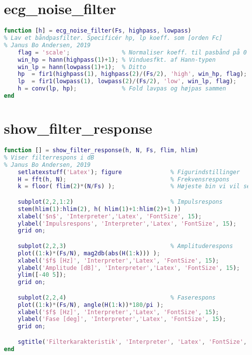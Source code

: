\documentclass[a4paper]{report}
\begin{document}
\section{ecg\_noise\_filter}

        
\begin{lstlisting}[language=Matlab, style=Matlab-editor]
function [h] = ecg_noise_filter(Fs, highpass, lowpass)
% Lav et båndpasfilter. Specificér hp, lp koeff. som [orden Fc]
% Janus Bo Andersen, 2019
    flag = 'scale';               % Normaliser koeff. til pasbånd på 0 dB
    win_hp = hann(highpass(1)+1); % Vinduesfkt. af Hann-typen
    win_lp = hann(lowpass(1)+1);  % Ditto
    hp  = fir1(highpass(1), highpass(2)/(Fs/2), 'high', win_hp, flag);
    lp  = fir1(lowpass(1), lowpass(2)/(Fs/2), 'low', win_lp, flag);
    h = conv(lp, hp);             % Fold lavpas og højpas sammen
end
\end{lstlisting}



\section{show\_filter\_response}

        
\begin{lstlisting}[language=Matlab, style=Matlab-editor]
function [] = show_filter_response(h, N, Fs, flim, hlim)
% Viser filterrespons i dB
% Janus Bo Andersen, 2019
    setlatexstuff('Latex'); figure              % Figurindstillinger
    H = fft(h, N);                              % Frekvensrespons
    k = floor( flim(2)*(N/Fs) );                % Højeste bin vi vil se

    subplot(2,2,1:2)                            % Impulsrespons
    stem(hlim(1):hlim(2), h( hlim(1)+1:hlim(2)+1 ))
    xlabel('$n$', 'Interpreter','Latex', 'FontSize', 15);
    ylabel('Impulsrespons', 'Interpreter','Latex', 'FontSize', 15);
    grid on;

    subplot(2,2,3)                              % Amplituderespons
    plot((1:k)*(Fs/N), mag2db(abs(H(1:k))) );
    xlabel('$f$ [Hz]', 'Interpreter','Latex', 'FontSize', 15);
    ylabel('Amplitude [dB]', 'Interpreter','Latex', 'FontSize', 15);
    ylim([-40 5]);
    grid on;

    subplot(2,2,4)                              % Faserespons
    plot((1:k)*(Fs/N), angle(H(1:k))*180/pi );
    xlabel('$f$ [Hz]', 'Interpreter','Latex', 'FontSize', 15);
    ylabel('Fase [deg]', 'Interpreter','Latex', 'FontSize', 15);
    grid on;

    sgtitle('Filterkarakteristik', 'Interpreter', 'Latex', 'FontSize', 20);
end
\end{lstlisting}
\end{document}
